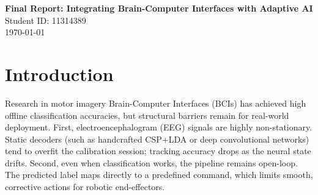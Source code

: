 \documentclass[12pt, a4paper]{article}
\begin{document}
\raggedright

\begin{center}
    {\Large \textbf{Final Report: Integrating Brain-Computer Interfaces with Adaptive AI}} \\[1em]
    {\large Student ID: 11314389} \\[1em]
    {\large \today}
\end{center}

\vspace{2em}

\begin{abstract}
Motor imagery Brain-Computer Interfaces (BCIs) face real-world deployment challenges due to the non-stationarity of electroencephalogram (EEG) signals and the constraints of open-loop classification pipelines. This project introduces CTNet, a sequential decision-making framework that applies Reinforcement Learning (RL) to close the control loop. By combining One-vs-Rest Common Spatial Patterns (OVR-CSP) with a 1D-CNN+LSTM Q-network, the architecture uses spatiotemporal models to handle signal drift. 
The system was evaluated across three distinct datasets: BCI Competition IV-2a, IV-2b, and PhysioNet EEGMMIDB. Empirical results demonstrate a competitive mean accuracy of 79.4\% (with a 91.3\% peak) on 4-class motor imagery, surpassing standard CNN baselines. Furthermore, evaluation on lateral binary commands yielded an 85\% accuracy, suggesting the pipeline's viability for smooth, continuous robotic actuation. This report details the methodology from data acquisition to policy optimization, analyzes the empirical results, discusses the mechanism-based advantages of RL in BCI, and outlines future deployment strategies.
\end{abstract}

\newpage
\tableofcontents
\newpage

\section{Introduction}

Research in motor imagery Brain-Computer Interfaces (BCIs) has achieved high offline classification accuracies, but structural barriers remain for real-world deployment. First, electroencephalogram (EEG) signals are highly non-stationary. Static decoders (such as handcrafted CSP+LDA or deep convolutional networks) tend to overfit the calibration session; tracking accuracy drops as the neural state drifts. Second, even when classification works, the pipeline remains open-loop. The predicted label maps directly to a predefined command, which limits smooth, corrective actions for robotic end-effectors.
\end{document}
